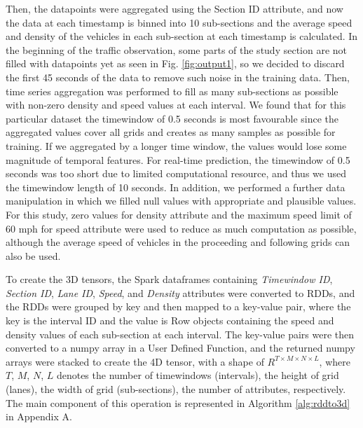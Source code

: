 \documentclass[11pt]{uonthesis}
\begin{document}
Then, the datapoints were aggregated using the Section ID attribute, and now the data at each timestamp is binned into 10 sub-sections and the average speed and density of the vehicles in each sub-section at each timestamp is calculated. In the beginning of the traffic observation, some parts of the study section are not filled with datapoints yet as seen in Fig. \ref{fig:output1}, so we decided to discard the first 45 seconds of the data to remove such noise in the training data. Then, time series aggregation was performed to fill as many sub-sections as possible with non-zero density and speed values at each interval. We found that for this particular dataset the timewindow of 0.5 seconds is most favourable since the aggregated values cover all grids and creates as many samples as possible for training. If we aggregated by a longer time window, the values would lose some magnitude of temporal features. For real-time prediction, the timewindow of 0.5 seconds was too short due to limited computational resource, and thus we used the timewindow length of 10 seconds. In addition, we performed a further data manipulation in which we filled null values with appropriate and plausible values. For this study, zero values for density attribute and the maximum speed limit of 60 mph for speed attribute were used to reduce as much computation as possible, although the average speed of vehicles in the proceeding and following grids can also be used. 

To create the 3D tensors, the Spark dataframes containing \textit{Timewindow ID}, \textit{Section ID}, \textit{Lane ID}, \textit{Speed}, and \textit{Density} attributes were converted to RDDs, and the RDDs were grouped by key and then mapped to a key-value pair, where the key is the interval ID and the value is Row objects containing the speed and density values of each sub-section at each interval. The key-value pairs were then converted to a numpy array in a User Defined Function, and the returned numpy arrays were stacked to create the 4D tensor, with a shape of $R^{T{\times}M{\times}N{\times}L}$, where $T$, $M$, $N$, $L$ denotes the number of timewindows (intervals), the height of grid (lanes), the width of grid (sub-sections), the number of attributes, respectively. The main component of this operation is represented in Algorithm \ref{alg:rddto3d} in Appendix A. %
\end{document}
